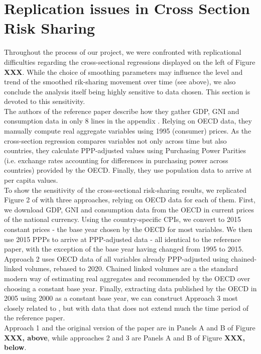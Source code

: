 \documentclass[12pt,a4paper]{article}
\begin{document}
\newpage
\section{Replication issues in Cross Section Risk Sharing}
Throughout the process of our project, we were confronted with replicational difficulties
regarding the cross-sectional regressions displayed on the left of Figure \textbf{XXX}. While the choice of smoothing
parameters may influence the level and trend of the smoothed rik-sharing movement over time (see above), we also conclude the
analysis itself being highly sensitive to data chosen. This section is devoted to this sensitivity.\\
The authors of the reference paper describe how they gather GDP, GNI and consumption data in only 8 lines in the appendix \parencite[p.604]{main}.
Relying on OECD data, they manually compute real aggregate variables using 1995 (consumer) prices. As the cross-section regression compares 
variables not only across time but also countries, they calculate PPP-adjusted values using Purchasing Power Parities (i.e. exchange rates
accounting for differences in purchasing power across countries) provided by the OECD. Finally, they use population data to arrive at per capita values.\\
To show the sensitivity of the cross-sectional risk-sharing results, we replicated Figure 2 of \textcite{main} with three approaches, relying on OECD data for each of them.
First, we download GDP, GNI and consumption data from the OECD in current prices of the national currency. Using the country-specific CPIs, we convert to 2015 constant prices - the base 
year chosen by the OECD for most variables. We then use 2015 PPPs to arrive at PPP-adjusted data - all identical to the reference paper, with the exception of
the base year having changed from 1995 to 2015. Approach 2 uses OECD data of all variables already PPP-adjusted using chained-linked volumes, rebased to 2020. Chained linked volumes
are a the standard modern way of estimating real aggregates and recommended by the OECD over choosing a constant base year. Finally, extracting data published by the OECD in 2005 using 2000 as a constant base year,
we can construct Approach 3 most closely related to \textcite{main}, but with data that does not extend much the time period of the reference paper.\\
Approach 1 and the original version of the paper are in Panels A and B of Figure \textbf{XXX, above}, while approaches 2 and 3 are Panels A and B of Figure \textbf{XXX, below}.\\
\end{document}
